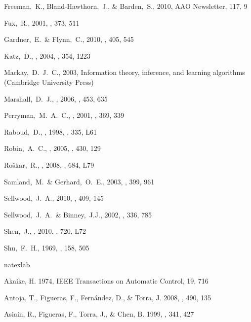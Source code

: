 \begin{thebibliography}{99}
  Freeman,~K., Bland-Hawthorn,~J., \& Barden,~S., 2010, 
  AAO Newsletter, 117, 9

  Fux,~R., 2001,
  \aap, 373, 511

  Gardner,~E.~\& Flynn,~C., 2010,
  \mnras, 405, 545

  Katz,~D., \etal, 2004,
\mnras, 354, 1223

  Mackay,~D.~J.~C., 2003,
  Information theory, inference, and learning algorithms (Cambridge University Press)

  Marshall,~D.~J., \etal, 2006,
  \aap, 453, 635

  Perryman,~M.~A.~C., \etal, 2001,
  \aap, 369, 339

  Raboud,~D., \etal, 1998,
  \aap, 335, L61

  Robin,~A.~C., \etal, 2005,
  \aap, 430, 129

  Ro{\v s}kar,~R., \etal, 2008,
  \apjl, 684, L79

  Samland,~M.~\& Gerhard,~O.~E., 2003,
  \aap, 399, 961

  Sellwood,~J.~A., 2010,
  \mnras, 409, 145

  Sellwood,~J.~A.~\& Binney,~J.J., 2002,
  \mnras, 336, 785

  Shen,~J., \etal, 2010, \apj, 720, L72

  Shu,~F.~H., 1969,
  \apj, 158, 505



\expandafter\ifx\csname natexlab\endcsname\relax\def\natexlab#1{#1}\fi

{Akaike}, H. 1974, {IEEE Transactions on Automatic Control}, 19, 716

{Antoja}, T., {Figueras}, F., {Fern{\'a}ndez}, D., \& {Torra}, J. 2008, \aap,
  490, 135

{Asiain}, R., {Figueras}, F., {Torra}, J., \& {Chen}, B. 1999, \aap, 341, 427


\end{thebibliography}
